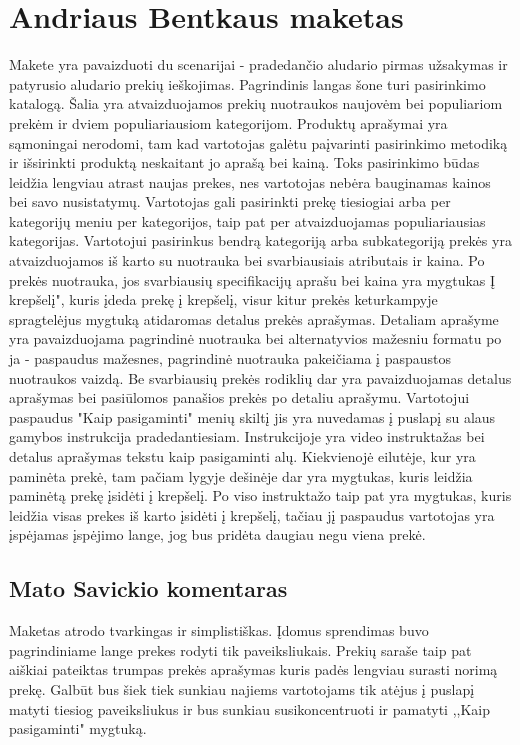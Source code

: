 \documentclass[oneside]{VUMIFPSkursinis}
\begin{document}
\section{Andriaus Bentkaus maketas}
	Makete yra pavaizduoti du scenarijai - pradedančio aludario pirmas užsakymas ir patyrusio aludario prekių ieškojimas.
	Pagrindinis langas šone turi pasirinkimo katalogą.
	Šalia yra atvaizduojamos prekių nuotraukos naujovėm bei populiariom prekėm ir dviem populiariausiom kategorijom.
	Produktų aprašymai yra sąmoningai nerodomi, tam kad vartotojas galėtu paįvarinti pasirinkimo metodiką ir išsirinkti produktą neskaitant jo aprašą bei kainą.
	Toks pasirinkimo būdas leidžia lengviau atrast naujas prekes, nes vartotojas nebėra bauginamas kainos bei savo nusistatymų. \newline
	Vartotojas gali pasirinkti prekę tiesiogiai arba per kategorijų meniu per kategorijos, taip pat per atvaizduojamas populiariausias kategorijas.
	Vartotojui pasirinkus bendrą kategoriją arba subkategoriją prekės yra atvaizduojamos iš karto su nuotrauka bei svarbiausiais atributais ir kaina.
	Po prekės nuotrauka, jos svarbiausių specifikacijų aprašu bei kaina yra mygtukas Į krepšelį", kuris įdeda prekę į krepšelį, visur kitur prekės keturkampyje spragtelėjus mygtuką atidaromas detalus prekės aprašymas. \newline
	Detaliam aprašyme yra pavaizduojama pagrindinė nuotrauka bei alternatyvios mažesniu formatu po ja - paspaudus mažesnes, pagrindinė nuotrauka pakeičiama į paspaustos nuotraukos vaizdą.
	Be svarbiausių prekės rodiklių dar yra pavaizduojamas detalus aprašymas bei pasiūlomos panašios prekės po detaliu aprašymu. \newline
	Vartotojui paspaudus "Kaip pasigaminti" menių skiltį jis yra nuvedamas į puslapį su alaus gamybos instrukcija pradedantiesiam.
	Instrukcijoje yra video instruktažas bei detalus aprašymas tekstu kaip pasigaminti alų.
	Kiekvienojė eilutėje, kur yra paminėta prekė, tam pačiam lygyje dešinėje dar yra mygtukas, kuris leidžia paminėtą prekę įsidėti į krepšelį.
	Po viso instruktažo taip pat yra mygtukas, kuris leidžia visas prekes iš karto įsidėti į krepšelį, tačiau jį paspaudus vartotojas yra įspėjamas įspėjimo lange, jog bus pridėta daugiau negu viena prekė.

	\subsection{Mato Savickio komentaras}
Maketas atrodo tvarkingas ir simplistiškas. Įdomus sprendimas buvo pagrindiniame lange prekes rodyti tik paveiksliukais. Prekių saraše taip pat aiškiai pateiktas trumpas prekės aprašymas kuris padės lengviau surasti norimą prekę. Galbūt bus šiek tiek sunkiau najiems vartotojams tik atėjus į puslapį matyti tiesiog paveiksliukus ir bus sunkiau susikoncentruoti ir pamatyti ,,Kaip pasigaminti" mygtuką.
\end{document}
